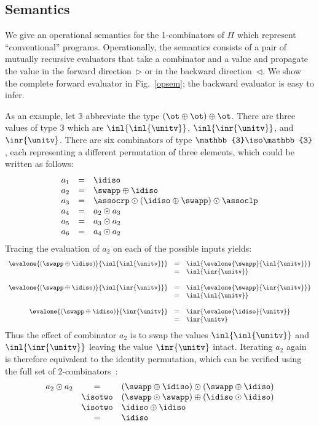 \subsection{Semantics}
\label{sec:pisem}

We give an operational semantics for the 1-combinators of $\Pi$ which
represent ``conventional'' programs.  Operationally, the semantics
consists of a pair of mutually recursive evaluators that take a
combinator and a value and propagate the value in the forward
direction~$\triangleright$ or in the backward
direction~$\triangleleft$. We show the complete forward evaluator in
Fig.~\ref{opsem}; the backward evaluator is easy to infer.

As an example, let $\mathbb{3}$ abbreviate the type
$(\ot \oplus \ot) \oplus \ot$. There are three values of type
$\mathbb{3}$ which are $\inl{\inl{\unitv}}$, $\inl{\inr{\unitv}}$, and
$\inr{\unitv}$. There are six combinators of type
$\mathbb{3} \iso \mathbb{3}$, each representing a different
permutation of three elements, which could be written as follows:
\[\begin{array}{rcl}
a_1 &=& \idiso \\
a_2 &=& \swapp \oplus \idiso \\
a_3 &=& \assocrp \odot (\idiso \oplus \swapp) \odot \assoclp \\
a_4 &=& a_2 \odot a_3 \\
a_5 &=& a_3 \odot a_2 \\
a_6 &=& a_4 \odot a_2
\end{array}\]
Tracing the evaluation of $a_2$ on each of the possible inputs yields:
\[\begin{array}{rcl}
\evalone{(\swapp\oplus\idiso)}{\inl{\inl{\unitv}}} &=& \inl{\evalone{\swapp}{\inl{\unitv}}} \\
&=& \inl{\inr{\unitv}} \\
\\
\evalone{(\swapp\oplus\idiso)}{\inl{\inr{\unitv}}} &=& \inl{\evalone{\swapp}{\inr{\unitv}}} \\
&=& \inl{\inl{\unitv}} \\
\\
\evalone{(\swapp\oplus\idiso)}{\inr{\unitv}} &=& \inr{\evalone{\idiso}{\unitv}} \\
&=& \inr{\unitv}
\end{array}\]
Thus the effect of combinator $a_2$ is to swap the values
$\inl{\inl{\unitv}}$ and $\inl{\inr{\unitv}}$ leaving the value
$\inr{\unitv}$ intact. Iterating $a_2$ again is therefore equivalent
to the identity permutation, which can be verified using the full set of
2-combinators~\cite{Carette2016}:
\[\begin{array}{rcl}
a_2 \odot a_2 &=& (\swapp \oplus \idiso) \odot (\swapp \oplus \idiso) \\
&\isotwo& (\swapp \odot \swapp) \oplus (\idiso \odot \idiso) \\
&\isotwo& \idiso \oplus \idiso \\
&=& \idiso
\end{array}\]

